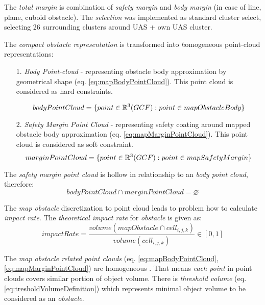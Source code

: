 \noindent The \emph{total margin} is combination of \emph{safety margin} and \emph{body margin} (in case of line, plane, cuboid obstacle). The \emph{selection} was implemented as standard cluster select, selecting 26  surrounding clusters around UAS + own UAS cluster.

The \emph{compact obstacle representation} is transformed into \emph homogeneous point-cloud representations:

\begin{itemize}
    \item[1.]\emph{Body Point-cloud} - representing obstacle body approximation by geometrical shape (eq. \ref{eq:mapBodyPointCloud}). This point cloud is considered as hard constraints.
    
    \begin{equation}\label{eq:mapBodyPointCloud}
        body Point Cloud  =\{point\in\mathbb{R}^3(GCF): point \in map Obstacle Body\}
    \end{equation}
    
    \item[2.]\emph{Safety Margin Point Cloud} - representing safety coating around mapped obstacle body approximation (eq. \ref{eq:mapMarginPointCloud}). This point cloud is considered as soft constraint.
    \begin{equation}\label{eq:mapMarginPointCloud}
        margin Point Cloud = \{point\in\mathbb{R}^3(GCF): point \in map Safety Margin\}
    \end{equation}
\end{itemize}

\begin{note}
    The \emph{safety margin point cloud} is hollow in relationship to an \emph{body point cloud}, therefore:
    \begin{equation*}
        body Point Cloud \cap margin Point Cloud  = \varnothing
    \end{equation*}
\end{note}

\noindent The \emph{map obstacle} discretization to point cloud leads to problem how to calculate \emph{impact rate}. The \emph{theoretical impact rate} for \emph{obstacle} is given as:
\begin{equation*}
    impact Rate = \frac{volume(map Obstacle\cap cell_{i,j,k})}{volume(cell_{i,j,k})}\in [0,1]
\end{equation*}

\noindent The \emph{map obstacle related point clouds} (eq. \ref{eq:mapBodyPointCloud}, \ref{eq:mapMarginPointCloud}) are homogeneous \cite{cernamaria2018}. That means \emph{each point} in point clouds covers similar portion of object volume. There is \emph{threshold volume} (eq. \ref{eq:tresholdVolumeDefinition}) which represents minimal object volume to be considered as an \emph{obstacle}.

